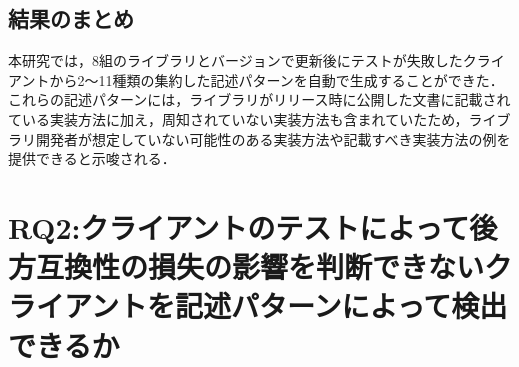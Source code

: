 \documentclass[11pt]{jreport}
\newcommand{\RQTwo}{クライアントのテストによって後方互換性の損失の影響を判断できないクライアントを記述パターンによって検出できるか}
\begin{document}
\subsection{結果のまとめ}
本研究では，8組のライブラリとバージョンで更新後にテストが失敗したクライアントから2〜11種類の集約した記述パターンを自動で生成することができた．これらの記述パターンには，ライブラリがリリース時に公開した文書に記載されている実装方法に加え，周知されていない実装方法も含まれていたため，ライブラリ開発者が想定していない可能性のある実装方法や記載すべき実装方法の例を提供できると示唆される．

\section{RQ2:\RQTwo}\label{sec:RQ2}

\end{document}
